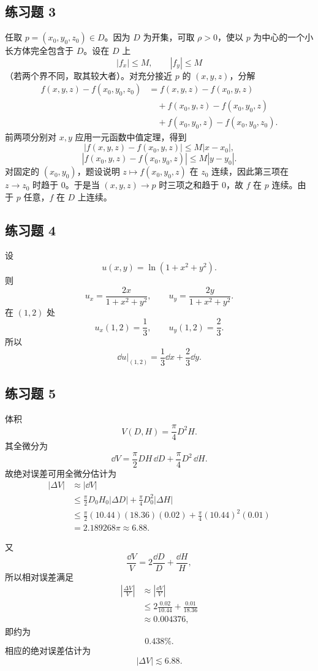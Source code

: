 \subsection*{练习题 3}
\begin{xsolution}
任取 $p=(x_0,y_0,z_0)\in D$。因为 $D$ 为开集，可取 $\rho>0$，使以 $p$ 为中心的一个小长方体完全包含于 $D$。设在 $D$ 上
\[
  |f_x|\le M,
  \qquad
  |f_y|\le M
\]
（若两个界不同，取其较大者）。对充分接近 $p$ 的 $(x,y,z)$，分解
\begin{align*}
  f(x,y,z)-f(x_0,y_0,z_0)
  &=f(x,y,z)-f(x_0,y,z)\\
  &\quad+f(x_0,y,z)-f(x_0,y_0,z)\\
  &\quad+f(x_0,y_0,z)-f(x_0,y_0,z_0).
\end{align*}
前两项分别对 $x,y$ 应用一元函数中值定理，得到
\[
  |f(x,y,z)-f(x_0,y,z)|\le M|x-x_0|,
\]
\[
  |f(x_0,y,z)-f(x_0,y_0,z)|\le M|y-y_0|.
\]
对固定的 $(x_0,y_0)$，题设说明 $z\mapsto f(x_0,y_0,z)$ 在 $z_0$ 连续，因此第三项在 $z\to z_0$ 时趋于 $0$。于是当 $(x,y,z)\to p$ 时三项之和趋于 $0$，故 $f$ 在 $p$ 连续。由于 $p$ 任意，$f$ 在 $D$ 上连续。
\end{xsolution}

\subsection*{练习题 4}
\begin{xsolution}
设
\[
  u(x,y)=\ln(1+x^2+y^2).
\]
则
\[
  u_x=\frac{2x}{1+x^2+y^2},
  \qquad
  u_y=\frac{2y}{1+x^2+y^2}.
\]
在 $(1,2)$ 处
\[
  u_x(1,2)=\frac13,
  \qquad
  u_y(1,2)=\frac23.
\]
所以
\[
  \boxed{\dd u\big|_{(1,2)}=\frac13\dd x+\frac23\dd y}.
\]
\end{xsolution}

\subsection*{练习题 5}
\begin{xsolution}
体积
\[
  V(D,H)=\frac\pi4D^2H.
\]
其全微分为
\[
  \dd V=\frac\pi2DH\,\dd D+\frac\pi4D^2\,\dd H.
\]
故绝对误差可用全微分估计为
\begin{align*}
  |\Delta V|
  &\approx |\dd V|\\
  &\le \frac\pi2D_0H_0|\Delta D|
       +\frac\pi4D_0^2|\Delta H|\\
  &\le \frac\pi2(10.44)(18.36)(0.02)
       +\frac\pi4(10.44)^2(0.01)\\
  &=2.189268\pi\approx6.88.
\end{align*}

又
\[
  \frac{\dd V}{V}=2\frac{\dd D}{D}+\frac{\dd H}{H},
\]
所以相对误差满足
\begin{align*}
  \left|\frac{\Delta V}{V}\right|
  &\approx\left|\frac{\dd V}{V}\right|\\
  &\le2\frac{0.02}{10.44}+\frac{0.01}{18.36}\\
  &\approx0.004376,
\end{align*}
即约为
\[
  \boxed{0.438\%}.
\]
相应的绝对误差估计为
\[
  \boxed{|\Delta V|\lesssim6.88}.
\]
\end{xsolution}

